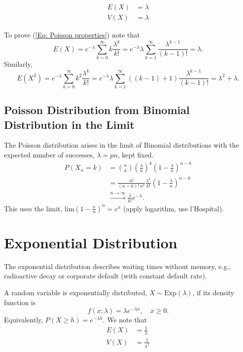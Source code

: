 \documentclass{article}
\begin{document}
\begin{equation}
\label{Eq: Poisson properties}
\begin{split}
E(X) &= \lambda \\
V(X) &= \lambda
\end{split}
\end{equation}

To prove (\ref{Eq: Poisson properties}) note that
\begin{equation*}
E(X) = e^{-\lambda} \sum_{k=0}^\infty k \frac{\lambda^k}{k!} = e^{-\lambda} \lambda \sum_{k=1}^\infty \frac{\lambda^{k-1}}{(k-1)!} = \lambda.
\end{equation*}
Similarly,
\begin{equation*}
E(X^2) = e^{-\lambda} \sum_{k=0}^\infty k^2 \frac{\lambda^k}{k!} = e^{-\lambda} \lambda \sum_{k=1}^\infty ((k-1) + 1) \frac{\lambda^{k-1}}{(k-1)!}
 = \lambda^2 + \lambda.
 \end{equation*}
 
 \subsection{Poisson Distribution from Binomial Distribution  in the Limit}
The Poisson distribution arises in the limit of Binomial distributions with the expected number of successes, $\lambda = pn$, kept fixed. 
\begin{equation*}
\begin{split}
P(X_n = k) &= {n \choose k} \left(\frac{\lambda}{n}\right)^k \left(1 - \frac{\lambda}{n}\right)^{n-k} \\
&= \frac{n!}{(n-k)! \, n^k} \frac{\lambda^k}{k!} \left(1 - \frac{\lambda}{n}\right)^{n-k} \\
& \xrightarrow {n \rightarrow \infty} \frac{\lambda}{k!} e^{-\lambda}.
\end{split}
\end{equation*}
This uses the limit, $\textrm{lim} \left(1-\frac{x}{n}\right)^n = e^x$ (apply logarithm, use l'Hospital).

 
 \section{Exponential Distribution}
 The exponential distribution describes waiting times without memory, e.g., radioactive decay or corporate default (with constant default rate).
 
 A random variable is exponentially distributed, $X \sim \textrm{Exp}(\lambda)$, if its density function is
 \begin{equation*}
 f(x;\lambda) = \lambda e^{-\lambda x}, \quad x \geq 0.
 \end{equation*}
 Equivalently, $P(X \geq h) = e^{-\lambda h}$. We note that
 \begin{equation}
 \begin{split}
 E(X) &= \frac{1}{\lambda} \\
 V(X) &= \frac{1}{\lambda^2}
 \end{split}
 \end{equation} 
 
\end{document}
